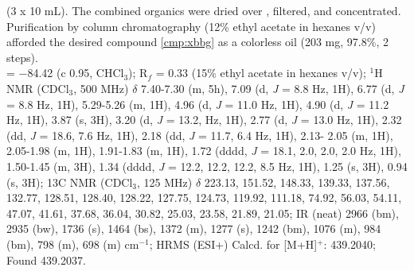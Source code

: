 (3 x 10 mL). The combined organics were dried over , filtered, and concentrated.
Purification by column chromatography (12\% ethyl acetate in hexanes v/v) afforded the desired
compound \ref{cmp:xbbg} as a colorless oil (203 mg, 97.8\%, 2 steps).\\
\rotation = $-$84.42 (c 0.95, CHCl$_3$); R$_f$ = 0.33 (15\% ethyl acetate in hexanes v/v); $^1$H NMR (CDCl$_3$,
500 MHz) $\delta$ 7.40-7.30 (m, 5h), 7.09 (d, \textit{J} = 8.8 Hz, 1H), 6.77 (d, \textit{J} = 8.8 Hz, 1H), 5.29-5.26 (m,
1H), 4.96 (d, \textit{J} = 11.0 Hz, 1H), 4.90 (d, \textit{J} = 11.2 Hz, 1H), 3.87 (s, 3H), 3.20 (d, \textit{J} = 13.2, Hz, 1H),
2.77 (d, \textit{J} = 13.0 Hz, 1H), 2.32 (dd, \textit{J} = 18.6, 7.6 Hz, 1H), 2.18 (dd, \textit{J} = 11.7, 6.4 Hz, 1H), 2.13-
2.05 (m, 1H), 2.05-1.98 (m, 1H), 1.91-1.83 (m, 1H), 1.72 (dddd, \textit{J} = 18.1, 2.0, 2.0, 2.0 Hz, 1H),
1.50-1.45 (m, 3H), 1.34 (dddd, \textit{J} = 12.2, 12.2, 12.2, 8.5 Hz, 1H), 1.25 (s, 3H), 0.94 (s, 3H); 13C
NMR (CDCl$_3$, 125 MHz) $\delta$ 223.13, 151.52, 148.33, 139.33, 137.56, 132.77, 128.51, 128.40,
128.22, 127.75, 124.73, 119.92, 111.18, 74.92, 56.03, 54.11, 47.07, 41.61, 37.68, 36.04, 30.82,
25.03, 23.58, 21.89, 21.05; IR (neat) 2966 (bm), 2935 (bw), 1736 (s), 1464 (bs), 1372 (m), 1277
(s), 1242 (bm), 1076 (m), 984 (bm), 798 (m), 698 (m) cm$^{-1}$; HRMS (ESI+) Calcd. for
 [M+H]$^+$: 439.2040; Found 439.2037.

